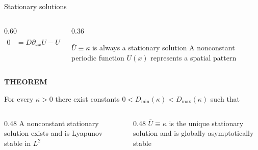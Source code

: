 

\begin{frame}{Stationary solutions}

  \vspace{-0.10cm}

  \begin{columns}[c,onlytextwidth]
    \begin{column}{0.60\textwidth}
      {\color{HydraWhite}\fontsize{10.2}{12.9}\selectfont
      \begin{align*}
        0
        &=D\partial_{xx}U-U
        +\kappa
        \frac{e^{U(x)}}
        {\displaystyle\int_0^1e^{U(y)}\,dy}
      \end{align*}
      }
    \end{column}

    \begin{column}{0.36\textwidth}
      \begin{minipage}{\linewidth}
          {$\bar U\equiv\kappa$ is always a stationary solution}
        \vspace{-0.06cm}
          {A nonconstant periodic function $U(x)$ represents a spatial pattern}
      \end{minipage}
    \end{column}
  \end{columns}

  \vspace{1.24cm}

  {\color{HydraGold}\bfseries\fontsize{8.2}{9.8}\selectfont
    THEOREM\par}

  \vspace{0.02cm}

  {\color{HydraWhite}\fontsize{8.2}{10.4}\selectfont
    For every $\kappa>0$ there exist constants
    $0<D_{\min}(\kappa)<D_{\max}(\kappa)$ such that
  \par}

  \vspace{0.06cm}

  \begin{columns}[T,onlytextwidth]
    \begin{column}{0.48\textwidth}
        {A nonconstant stationary solution exists and is Lyapunov stable in $L^2$}
    \end{column}

    \begin{column}{0.48\textwidth}
        {$\bar U\equiv\kappa$ is the unique stationary solution and is globally asymptotically stable}
    \end{column}
  \end{columns}

\end{frame}


